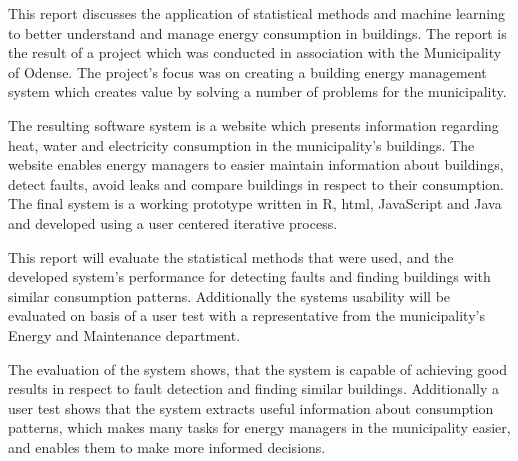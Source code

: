 This report discusses the application of statistical methods and machine learning  to better understand and manage energy consumption in buildings. The report is the result of a project which was conducted  in association with the Municipality of Odense. The project’s focus was on creating a building energy management system which creates value by solving a number of problems for the municipality.

The  resulting software system is a website  which presents information regarding  heat, water and electricity consumption in the municipality's buildings. The website enables energy managers to easier maintain information about buildings, detect faults, avoid leaks and compare buildings in respect to their consumption. The final system is a working prototype written in R, html, JavaScript and Java and developed using a user centered iterative process. 

This report will evaluate the statistical methods that were used, and the developed system’s performance for detecting faults and finding buildings with similar consumption patterns. Additionally the systems usability will be evaluated on basis of a user test with a representative from the municipality's Energy and Maintenance department.

The evaluation of the system shows, that the system is capable of achieving good results in respect to fault detection and finding similar buildings. Additionally a user test shows that the system extracts useful information about consumption patterns, which makes many tasks for energy managers in the municipality easier, and enables them to make more informed decisions.